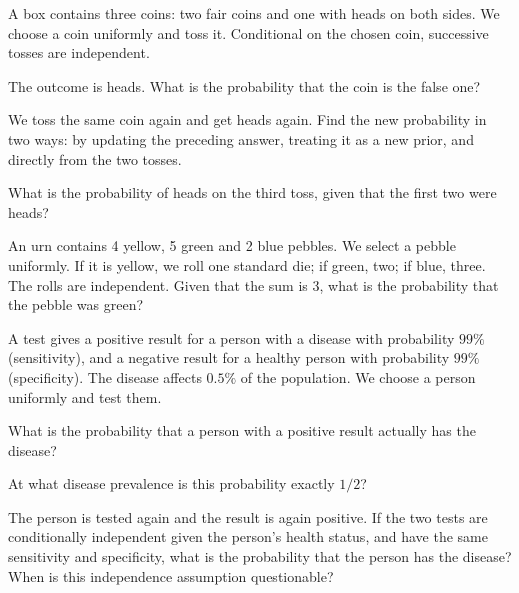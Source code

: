 \begin{problembook}
A box contains three coins: two fair coins and one with heads on both sides.
We choose a coin uniformly and toss it. Conditional on the chosen coin, successive tosses are independent.
\begin{enumeratea}
  \item The outcome is heads. What is the probability that the coin is the false one?
  \item We toss the same coin again and get heads again. Find the new probability
  in two ways: by updating the preceding answer, treating it as a new prior,
  and directly from the two tosses.
  \item What is the probability of heads on the third toss, given that the first two were heads?
\end{enumeratea}
\end{problembook}
\begin{problempencil}[Test 1, SE 2023]
An urn contains 4 yellow, 5 green and 2 blue pebbles. We select a pebble uniformly.
If it is yellow, we roll one standard die; if green, two; if blue, three.
The rolls are independent. Given that the sum is 3, what is the probability that the pebble was green?
\end{problempencil}
\begin{problembook}
A test gives a positive result for a person with a disease with probability $99\%$
(sensitivity), and a negative result for a healthy person with probability $99\%$
(specificity). The disease affects $0.5\%$ of the population. We choose a person uniformly and test them.
\begin{enumeratea}
  \item What is the probability that a person with a positive result actually has the disease?
  \item At what disease prevalence is this probability exactly $1/2$?
  \item The person is tested again and the result is again positive. If the two tests
  are conditionally independent given the person's health status, and have the same
  sensitivity and specificity, what is the probability that the person has the disease?
  When is this independence assumption questionable?
\end{enumeratea}
\end{problembook}

